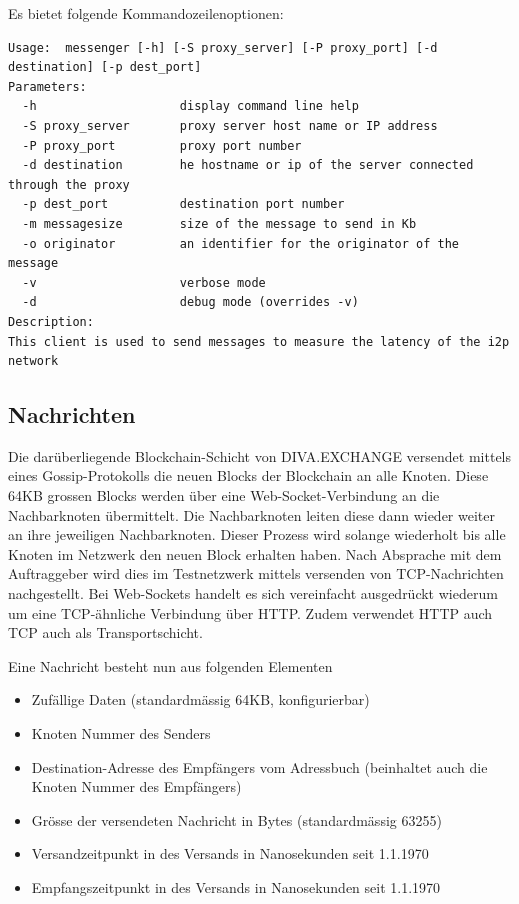 Es bietet folgende Kommandozeilenoptionen:

\begin{lstlisting}
Usage:  messenger [-h] [-S proxy_server] [-P proxy_port] [-d destination] [-p dest_port]
Parameters:
  -h                    display command line help
  -S proxy_server       proxy server host name or IP address
  -P proxy_port         proxy port number
  -d destination        he hostname or ip of the server connected through the proxy
  -p dest_port          destination port number
  -m messagesize        size of the message to send in Kb
  -o originator         an identifier for the originator of the message
  -v                    verbose mode
  -d                    debug mode (overrides -v)
Description:
This client is used to send messages to measure the latency of the i2p network
\end{lstlisting}

\subsection{Nachrichten}

Die darüberliegende Blockchain-Schicht von DIVA.EXCHANGE versendet mittels eines Gossip-Protokolls die neuen Blocks der Blockchain an alle Knoten.
Diese 64KB grossen Blocks werden über eine Web-Socket-Verbindung an die Nachbarknoten übermittelt.
Die Nachbarknoten leiten diese dann wieder weiter an ihre jeweiligen Nachbarknoten.
Dieser Prozess wird solange wiederholt bis alle Knoten im Netzwerk den neuen Block erhalten haben.
Nach Absprache mit dem Auftraggeber wird dies im Testnetzwerk mittels versenden von TCP-Nachrichten nachgestellt.
Bei Web-Sockets handelt es sich vereinfacht ausgedrückt wiederum um eine TCP-ähnliche Verbindung über HTTP. Zudem verwendet HTTP auch TCP auch als Transportschicht.

Eine Nachricht besteht nun aus folgenden Elementen

\begin{itemize}
    \item Zufällige Daten (standardmässig 64KB, konfigurierbar)
    \item Knoten Nummer des Senders
    \item Destination-Adresse des Empfängers vom Adressbuch (beinhaltet auch die Knoten Nummer des Empfängers)
    \item Grösse der versendeten Nachricht in Bytes (standardmässig 63255)
    \item Versandzeitpunkt in des Versands in Nanosekunden seit 1.1.1970 
    \item Empfangszeitpunkt in des Versands in Nanosekunden seit 1.1.1970 
\end{itemize}

